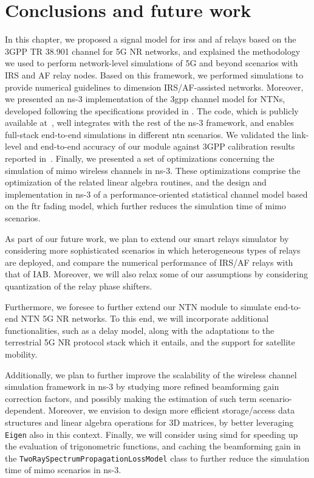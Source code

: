\section{Conclusions and future work}
\label{sec:conc}


In this chapter, we proposed a signal model for \glspl{irs} and \gls{af} relays based on the 3GPP TR 38.901 channel for 5G NR networks, and explained the methodology we used to perform network-level simulations of 5G and beyond scenarios with IRS and AF relay nodes.
Based on this framework, we performed simulations to provide numerical guidelines to dimension IRS/AF-assisted networks. Moreover, we presented an ns-3 implementation of the \gls{3gpp} channel model for NTNs, developed following the specifications provided in \cite{38811}.
The code, which is publicly available at~\cite{ntngitlab}, well integrates with the rest of the ns-3 framework, and enables full-stack end-to-end simulations in different \gls{ntn} scenarios. We validated the link-level and end-to-end accuracy of our module against 3GPP calibration results reported in~\cite{38821}. Finally, we presented a set of optimizations concerning the simulation of \gls{mimo} wireless channels in ns-3. These optimizations comprise the optimization of the related linear algebra routines, and the design and implementation in ns-3 of a performance-oriented statistical channel model based on the \gls{ftr} fading model, which further reduces the simulation time of \gls{mimo} scenarios. %


As part of our future work, we plan to extend our smart relays simulator by considering more sophisticated
scenarios in which heterogeneous types of relays are deployed, and compare the numerical performance of
IRS/AF relays with that of IAB. Moreover, we will also relax some of our assumptions by considering quantization of the
relay phase shifters.

Furthermore, we foresee to further extend our NTN module to simulate end-to-end NTN 5G NR networks. To this end, we will incorporate additional functionalities, such as a delay model, along with the adaptations to the terrestrial 5G NR protocol stack which it entails, and the support for satellite mobility.

Additionally, we plan to further improve the scalability of the wireless channel simulation framework in ns-3 by studying more refined beamforming gain correction factors, and possibly making the estimation of such term scenario-dependent. Moreover, we envision to design more efficient storage/access data structures and linear algebra operations for 3D matrices, by better leveraging \texttt{Eigen} also in this context.
Finally, we will consider using \gls{simd} for speeding up the evaluation of trigonometric functions, and caching the beamforming gain in the \texttt{Two\-Ray\-Spectrum\-Propagation\-Loss\-Model} class to further reduce the simulation time of \gls{mimo} scenarios in ns-3.

